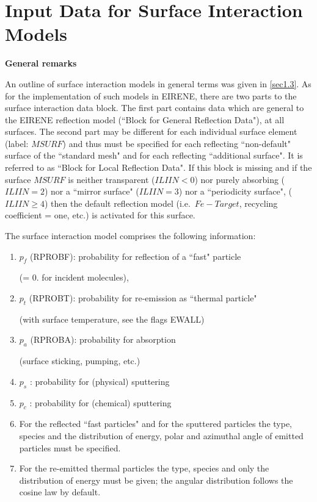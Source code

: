 \section{Input Data for Surface Interaction Models} \label{sec2.6}

\textbf{General remarks} 

\medskip 

An outline of surface interaction models in general terms was given in
\cref{sec1.3}.
As for the implementation of such models in EIRENE, there are two parts to the
surface interaction data block.
The first part contains data which are general to the EIRENE reflection model
(``Block for General Reflection Data"), at all surfaces.
The second part may be different for each individual surface element (label:
$MSURF$) and thus must be specified for each reflecting ``non-default" surface
of the ``standard mesh" and for each reflecting ``additional surface".
It is referred to as ``Block for Local Reflection Data".
If this block is missing and if the surface $MSURF$ is neither transparent
($ILIIN<0$) nor purely absorbing ($ILIIN=2$) nor a ``mirror surface"
($ILIIN=3$) nor a ``periodicity surface", ($ILIIN\ge 4$) then the default
reflection model (i.e.\ $Fe-Target$, recycling coefficient = one, etc.) is
activated for this surface.

The surface interaction model comprises the following information:

\begin{enumerate}
  \item $p_f$ (RPROBF): probability for reflection of a ``fast" particle

        (= 0.
        for incident molecules),
  \item $p_t$ (RPROBT): probability
        for re-emission as ``thermal particle"

        (with surface temperature, see the flags EWALL)
  \item $p_a$ (RPROBA):
        probability for absorption 

        (surface sticking, pumping, etc.)
  \item $p_s$ : probability for (physical) sputtering
  \item $p_c$ : probability
        for (chemical) sputtering
  \item For the reflected ``fast particles" and for the
        sputtered particles the type, species and the distribution of energy, polar and
        azimuthal angle of emitted particles must be specified.
  \item For the re-emitted thermal particles the type, species and only the
        distribution of energy must be given; the angular distribution follows the
        cosine law by default.
\end{enumerate}

